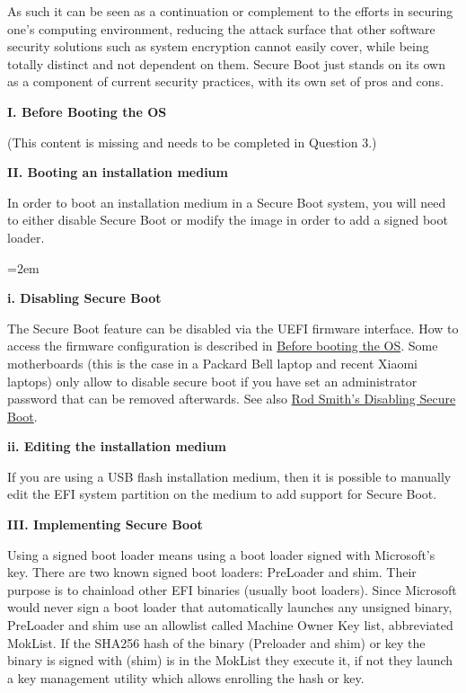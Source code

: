 \documentclass{exam-zh}
\begin{document}
As such it can be seen as a continuation or complement to the efforts in securing one's computing environment, reducing the attack surface that other software security solutions such as system encryption cannot easily cover, while being totally distinct and not dependent on them. Secure Boot just stands on its own as a component of current security practices, with its own set of pros and cons.

\textbf{I. Before Booting the OS}

(This content is missing and needs to be completed in Question 3.)

\textbf{II. Booting an installation medium}

In order to boot an installation medium in a Secure Boot system, you will need to either disable Secure Boot or modify the image in order to add a signed boot loader.

\begingroup
\leftskip=2em

\textbf{i. Disabling Secure Boot}

The Secure Boot feature can be disabled via the UEFI firmware interface. How to access the firmware configuration is described in \underline{Before booting the OS}. Some motherboards (this is the case in a Packard Bell laptop and recent Xiaomi laptops) only allow to disable secure boot if you have set an administrator password that can be removed afterwards. See also \underline{Rod Smith's Disabling Secure Boot}.

\textbf{ii. Editing the installation medium}

If you are using a USB flash installation medium, then it is possible to manually edit the EFI system partition on the medium to add support for Secure Boot.

\par
\endgroup

\textbf{III. Implementing Secure Boot}

Using a signed boot loader means using a boot loader signed with Microsoft's key. There are two known signed boot loaders: PreLoader and shim. Their purpose is to chainload other EFI binaries (usually boot loaders). Since Microsoft would never sign a boot loader that automatically launches any unsigned binary, PreLoader and shim use an allowlist called Machine Owner Key list, abbreviated MokList. If the SHA256 hash of the binary (Preloader and shim) or key the binary is signed with (shim) is in the MokList they execute it, if not they launch a key management utility which allows enrolling the hash or key.
\end{document}
